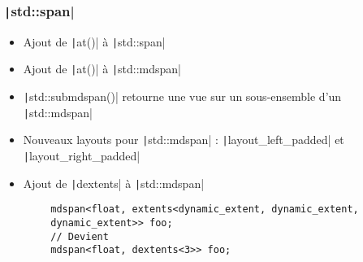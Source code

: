 \documentclass[C++.tex]{subfiles}
\begin{document}
\begin{frame}[fragile]
	\frametitle{\texttt|std::span|}
	\begin{itemize}
		\item Ajout de \texttt|at()| à \texttt|std::span|
		\item Ajout de \texttt|at()| à \texttt|std::mdspan|
		\item \texttt|std::submdspan()| retourne une vue sur un sous-ensemble d'un \texttt|std::mdspan|
		\item Nouveaux layouts pour \texttt|std::mdspan| : \texttt|layout_left_padded| et \texttt|layout_right_padded|
		\item Ajout de \texttt|dextents| à \texttt|std::mdspan|
	\end{itemize}

	\begin{verbatim}
		mdspan<float, extents<dynamic_extent, dynamic_extent,
		dynamic_extent>> foo;
		// Devient
		mdspan<float, dextents<3>> foo;
	\end{verbatim}


\end{frame}
\end{document}
